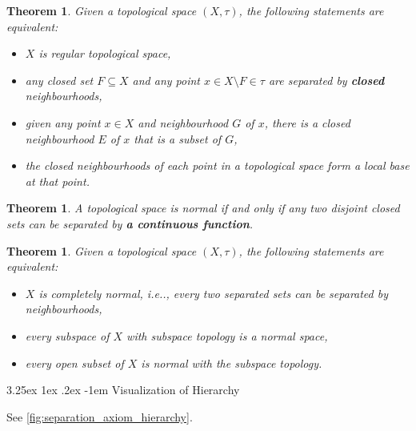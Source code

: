 \documentclass[12pt, letterpaper]{article}
\makeatletter
\renewcommand\subparagraph{\@startsection{subparagraph}{5}{\parindent}%
	{3.25ex \@plus1ex \@minus .2ex}%
	{0.75ex plus 0.1ex}%
	{\normalfont\normalsize\bfseries}}
\newcommand\ie{i.e\@ifnextchar.{}{.\@}}
\newtheorem{thm}[prop]{Theorem}
\renewcommand\subparagraph{\@startsection{subparagraph}{5}{\parindent}%
	{3.25ex \@plus1ex \@minus .2ex}%
	{-1em}%
	{\normalfont\normalsize\bfseries}}
\theoremstyle{definition}
\theoremstyle{remark}
\theoremstyle{definition}
\theoremstyle{plain}
\numberwithin{equation}{section}
\makeatother
\begin{document}
	\begin{thm}
		Given a topological space $(X,\tau)$, the following statements are equivalent:
		\begin{itemize}
			\item $X$ is regular topological space,
			\item any closed set $F\subseteq X$ and any point $x\in X\setminus F\in\tau$ 
			are separated by \textbf{closed} neighbourhoods,
			\item given any point $x\in X$ and neighbourhood $G$ of $x$, there is a closed neighbourhood $E$ of $x$ that is a subset of $G$,
			\item the closed neighbourhoods of each point in a topological space form a local base at that point.
		\end{itemize}
	\end{thm}
	

	\begin{thm}
		A topological space is normal if and only if any two disjoint closed sets can be separated by \textbf{a continuous function}.
	\end{thm}

	\begin{thm}
		Given a topological space $(X,\tau)$, the following statements are equivalent:
		\begin{itemize}
			\item $X$ is completely normal, \ie, every two separated sets can be separated by neighbourhoods,
			\item every subspace of $X$ with subspace topology is a normal space,
			\item every open subset of $X$ is normal with the subspace topology.
		\end{itemize}
	\end{thm}
	
	\subparagraph{Visualization of Hierarchy}
	
	See \ref{fig:separation_axiom_hierarchy}.
	
\end{document}
